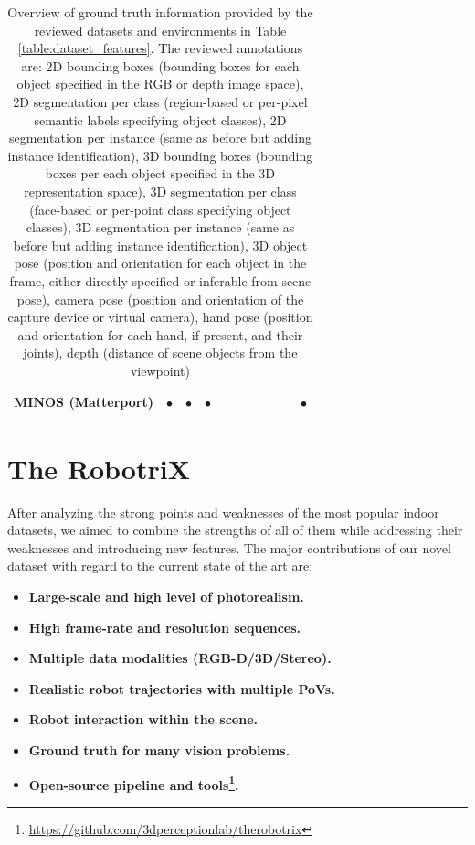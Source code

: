\begin{table}[!t]
{\begin{tabular}{|r|c|c|c|c|c|c|c|c|c|c|}
      MINOS (Matterport) \cite{Savva2017} & $\bullet$ & $\bullet$ & $\bullet$ & & & & & & & $\bullet$ \\
      \hline
    \end{tabular}}
    \smallskip
    \caption{Overview of ground truth information provided by the reviewed datasets and environments in Table \ref{table:dataset_features}. The reviewed annotations are: 2D bounding boxes (bounding boxes for each object specified in the RGB or depth image space), 2D segmentation per class (region-based or per-pixel semantic labels specifying object classes), 2D segmentation per instance (same as before but adding instance identification), 3D bounding boxes (bounding boxes per each object specified in the 3D representation space), 3D segmentation per class (face-based or per-point class specifying object classes), 3D segmentation per instance (same as before but adding instance identification), 3D object pose (position and orientation for each object in the frame, either directly specified or inferable from scene pose), camera pose (position and orientation of the capture device or virtual camera), hand pose (position and orientation for each hand, if present, and their joints), depth (distance of scene objects from the viewpoint)}
    \label{table:dataset_ground_truth}
  \end{table}

\section{The RobotriX}
\label{cha:sim2real:sec:proposal}

After analyzing the strong points and weaknesses of the most popular indoor datasets, we aimed to combine the strengths of all of them while addressing their weaknesses and introducing new features. The major contributions of our novel dataset with regard to the current state of the art are:

\begin{itemize}
	\item \textbf{Large-scale and high level of photorealism.}
  \item \textbf{High frame-rate and resolution sequences.}
  \item \textbf{Multiple data modalities (RGB-D/3D/Stereo).}
	\item \textbf{Realistic robot trajectories with multiple \acsp{PoV}.}
	\item \textbf{Robot interaction within the scene.}
  \item \textbf{Ground truth for many vision problems.}
  \item \textbf{Open-source pipeline and tools\footnote{\url{https://github.com/3dperceptionlab/therobotrix}}.}
\end{itemize}

